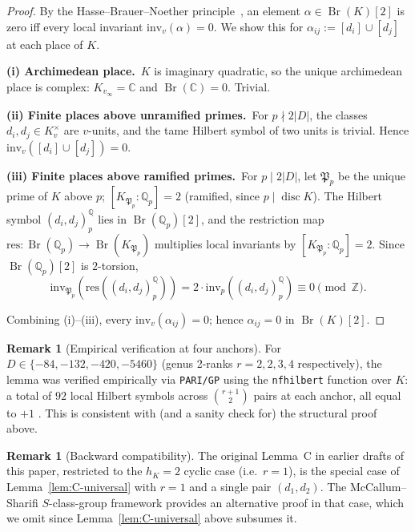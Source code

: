 \documentclass[11pt,a4paper]{amsart}
\theoremstyle{plain}
\theoremstyle{definition}
\newtheorem{remark}[theorem]{Remark}
\DeclareMathOperator{\Br}{Br}
\DeclareMathOperator{\disc}{disc}
\newcommand{\Q}{\mathbb{Q}}
\newcommand{\Z}{\mathbb{Z}}
\newcommand{\C}{\mathbb{C}}
\newcommand{\absD}{\lvert D\rvert}
\begin{document}
\begin{proof}
By the Hasse--Brauer--Noether principle~\cite[\S 11]{Tate1967}, an element
$\alpha \in \Br(K)[2]$ is zero iff every local invariant
$\mathrm{inv}_v(\alpha) = 0$. We show this for
$\alpha_{ij} := [d_i] \cup [d_j]$ at each place of $K$.

\smallskip\noindent\textbf{(i) Archimedean place.}\ $K$ is imaginary
quadratic, so the unique archimedean place is complex: $K_{v_\infty} = \C$
and $\Br(\C) = 0$. Trivial.

\smallskip\noindent\textbf{(ii) Finite places above unramified primes.}\
For $p \nmid 2\absD$, the classes $d_i, d_j \in K_v^\times$ are $v$-units,
and the tame Hilbert symbol of two units is trivial. Hence
$\mathrm{inv}_v([d_i]\cup[d_j]) = 0$.

\smallskip\noindent\textbf{(iii) Finite places above ramified primes.}\
For $p \mid 2\absD$, let $\mathfrak{P}_p$ be the unique prime of $K$ above
$p$; $[K_{\mathfrak{P}_p} : \Q_p] = 2$ (ramified, since $p \mid \disc K$).
The Hilbert symbol $(d_i, d_j)_p^\Q$ lies in $\Br(\Q_p)[2]$, and the
restriction map
$\mathrm{res}: \Br(\Q_p) \to \Br(K_{\mathfrak{P}_p})$
multiplies local invariants by $[K_{\mathfrak{P}_p}:\Q_p] = 2$. Since
$\Br(\Q_p)[2]$ is $2$-torsion,
\[
\mathrm{inv}_{\mathfrak{P}_p}(\mathrm{res}((d_i, d_j)_p^\Q))
= 2 \cdot \mathrm{inv}_p((d_i, d_j)_p^\Q) \equiv 0 \pmod \Z.
\]

Combining (i)--(iii), every $\mathrm{inv}_v(\alpha_{ij}) = 0$; hence
$\alpha_{ij} = 0$ in $\Br(K)[2]$.
\end{proof}

\begin{remark}[Empirical verification at four anchors]
\label{rk:cup-empirical}
For $D \in \{-84, -132, -420, -5460\}$ (genus 2-ranks $r = 2, 2, 3, 4$
respectively), the lemma was verified empirically via \texttt{PARI/GP}
using the \texttt{nfhilbert} function over $K$: a total of $92$ local
Hilbert symbols across $\binom{r+1}{2}$ pairs at each anchor, all equal
to $+1$ \cite[OP-LEMMA-C-FORMAL-K2]{Remondiere2026K2}. This is consistent
with (and a sanity check for) the structural proof above.
\end{remark}

\begin{remark}[Backward compatibility]\label{rk:C-coarse-special}
The original Lemma~C in earlier drafts of this paper, restricted to the
$h_K = 2$ cyclic case (i.e.\ $r = 1$), is the special case of
Lemma~\ref{lem:C-universal} with $r = 1$ and a single pair
$(d_1, d_2)$. The McCallum--Sharifi $S$-class-group framework
\cite[\S 2.4, Prop.~2.7]{McCallumSharifi2002} provides an alternative
proof in that case, which we omit since Lemma~\ref{lem:C-universal}
above subsumes it.
\end{remark}
\end{document}
